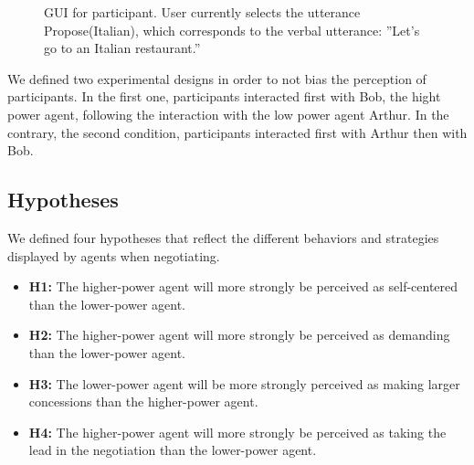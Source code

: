 \documentclass[runningheads,a4paper]{llncs}
\begin{document}
	\begin{figure}[t]
		\centering
		\caption{GUI for participant. User currently selects the utterance Propose(Italian), which corresponds to the verbal utterance:  ''Let's go to an Italian restaurant.''}
		\label{ihm}
	\end{figure}
	
	We defined two experimental designs in order to not bias the perception of participants. In the first one, participants interacted first with Bob, the hight power agent, following the interaction with the low power agent Arthur. In the contrary, the second condition, participants interacted first with Arthur then with Bob. 
	
	\subsection{Hypotheses}
	We defined four hypotheses that reflect the different behaviors and strategies displayed by agents when negotiating.
	
	\begin{itemize}
		\item  \textbf{H1:} The higher-power agent will more strongly be perceived as self-centered than the lower-power agent.  
		
		\item \textbf{H2:}  The higher-power agent will more strongly be perceived as demanding than the lower-power agent.
		
		\item \textbf{H3:} The lower-power agent will be more strongly perceived as making larger concessions than the higher-power agent.
		
		\item \textbf{H4:}  The higher-power agent will more strongly be perceived as taking the lead in the negotiation than the lower-power agent.
		
	\end{itemize}
	
\end{document}
